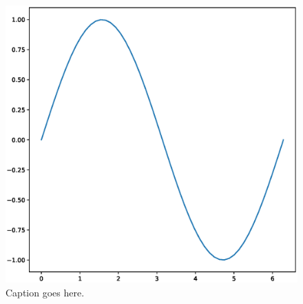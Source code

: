 \documentclass[twocolumn]{aastex62}
\begin{document}
\begin{figure}
    \includegraphics[width=\columnwidth]{figures/test.eps}
    \caption{Caption goes here.
    \label{fig:test}}
\end{figure}


\end{document}
